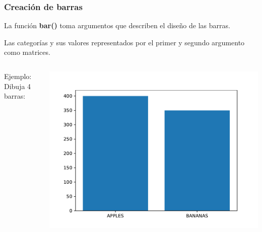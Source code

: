 \begin{frame}[fragile]
  \frametitle{Creación de barras}
  La función \textbf{bar()} toma argumentos que describen
  el diseño de las barras.

  Las categorías y sus valores representados por el primer
  y segundo argumento como matrices.
  \begin{columns}
        \begin{exampleblock}{Ejemplo:}
          Dibuja 4 barras:
          
        \end{exampleblock}
      \pausa
      \begin{center}
          \includegraphics[scale=0.5]{ejemplos/e07.pdf}
      \end{center}
  \end{columns}
\end{frame}

